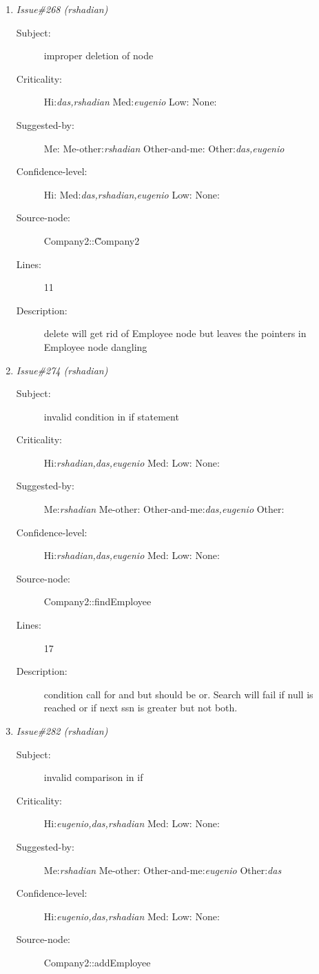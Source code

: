 \begin{enumerate}
\begin{description}
\item [Lines:] 7

\item [Description:] variable numEmloyee is not initialized
\end{description}
\item {\it Issue\#268 (rshadian)}
\begin{description}
\item [Subject:] improper deletion of node
\item [Criticality:] Hi:{\it das,rshadian} Med:{\it eugenio} Low:{\it } None:{\it }
\item [Suggested-by:] Me:{\it } Me-other:{\it rshadian} Other-and-me:{\it } Other:{\it das,eugenio}
\item [Confidence-level:] Hi:{\it } Med:{\it das,rshadian,eugenio} Low:{\it } None:{\it }
\item [Source-node:] Company2::\~Company2

\item [Lines:] 11

\item [Description:] delete will get rid of Employee node but leaves the pointers in Employee node
dangling
\end{description}
\item {\it Issue\#274 (rshadian)}
\begin{description}
\item [Subject:] invalid condition in if statement
\item [Criticality:] Hi:{\it rshadian,das,eugenio} Med:{\it } Low:{\it } None:{\it }
\item [Suggested-by:] Me:{\it rshadian} Me-other:{\it } Other-and-me:{\it das,eugenio} Other:{\it }
\item [Confidence-level:] Hi:{\it rshadian,das,eugenio} Med:{\it } Low:{\it } None:{\it }
\item [Source-node:] Company2::findEmployee

\item [Lines:] 17

\item [Description:] condition call for and but should be or.
Search will fail if null is reached or if next ssn is greater but not both.
\end{description}
\item {\it Issue\#282 (rshadian)}
\begin{description}
\item [Subject:] invalid comparison in if
\item [Criticality:] Hi:{\it eugenio,das,rshadian} Med:{\it } Low:{\it } None:{\it }
\item [Suggested-by:] Me:{\it rshadian} Me-other:{\it } Other-and-me:{\it eugenio} Other:{\it das}
\item [Confidence-level:] Hi:{\it eugenio,das,rshadian} Med:{\it } Low:{\it } None:{\it }
\item [Source-node:] Company2::addEmployee


\end{description}
\end{enumerate}
